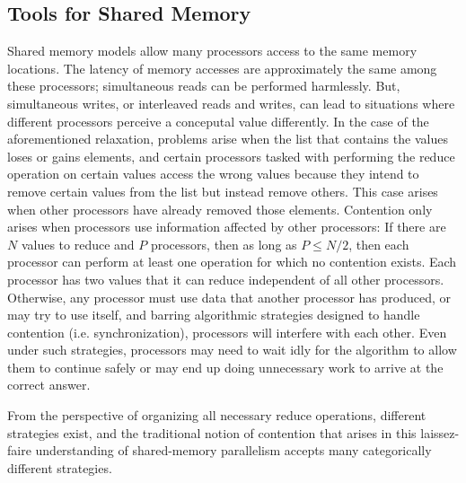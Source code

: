 \subsection{Tools for Shared Memory}
Shared memory models allow many processors access to the same memory locations.
The latency of memory accesses are approximately the same among these
processors; simultaneous reads can be performed harmlessly. But, simultaneous
writes, or interleaved reads and writes, can lead to situations where different
processors perceive a conceputal value differently. In the case of the
aforementioned relaxation, problems arise when the list that contains the values
loses or gains elements, and certain processors tasked with performing the
reduce operation on certain values access the wrong values because they intend
to remove certain values from the list but instead remove others. This case
arises when other processors have already removed those elements. Contention
only arises when processors use information affected by other processors: If
there are $N$ values to reduce and $P$ processors, then as long as $P \leq N/2$,
then each processor can perform at least one operation for which no contention
exists. Each processor has two values that it can reduce independent of all
other processors. Otherwise, any processor must use data that another processor
has produced, or may try to use itself, and barring algorithmic strategies
designed to handle contention (i.e. synchronization), processors will interfere
with each other. Even under such strategies, processors may need to wait idly
for the algorithm to allow them to continue safely or may end up doing
unnecessary work to arrive at the correct answer.

From the perspective of organizing all necessary reduce operations, different
strategies exist, and the traditional notion of contention that arises in this
laissez-faire understanding of shared-memory parallelism accepts many
categorically different strategies.

